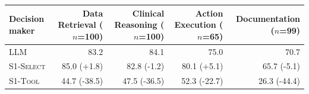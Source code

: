 \begin{tabular}{lrrrr}
\toprule
Decision maker & Data Retrieval ($n$=100) & Clinical Reasoning ($n$=100) & Action Execution ($n$=65) & Documentation ($n$=99) \\
\midrule
\textsc{LLM} & 83.2 & 84.1 & 75.0 & 70.7 \\
\textsc{S1-Select} & 85.0 (+1.8) & 82.8 (-1.2) & 80.1 (+5.1) & 65.7 (-5.1) \\
\textsc{S1-Tool} & 44.7 (-38.5) & 47.5 (-36.5) & 52.3 (-22.7) & 26.3 (-44.4) \\
\bottomrule
\end{tabular}
